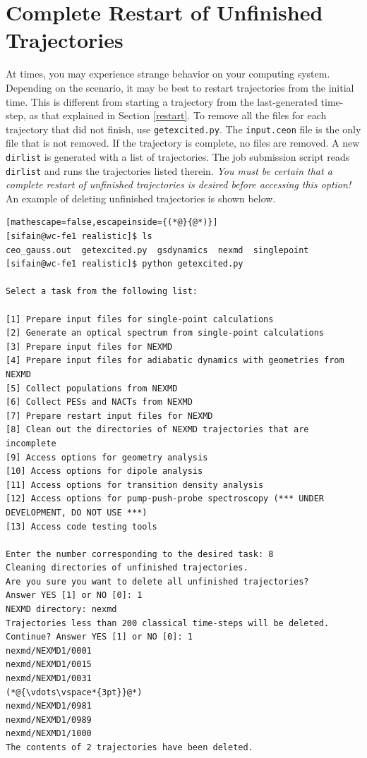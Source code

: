 \documentclass[letterpaper,12pt,titlepage]{article}
\begin{document}
\section{Complete Restart of Unfinished Trajectories}
At times, you may experience strange behavior on your computing system.  Depending on the scenario, it may be best to restart trajectories from the initial time.  This is different from starting a trajectory from the last-generated time-step, as that explained in Section \ref{restart}.  To remove all the files for each trajectory that did not finish, use \verb+getexcited.py+.  The \verb+input.ceon+ file is the only file that is not removed.  If the trajectory is complete, no files are removed.  A new \verb+dirlist+ is generated with a list of trajectories.  The job submission script reads \verb+dirlist+ and runs the trajectories listed therein.  \textit{You must be certain that a complete restart of unfinished trajectories is desired before accessing this option!}  An example of deleting unfinished trajectories is shown below.
\begin{lstlisting}[mathescape=false,escapeinside={(*@}{@*)}]
[sifain@wc-fe1 realistic]$ ls
ceo_gauss.out  getexcited.py  gsdynamics  nexmd  singlepoint
[sifain@wc-fe1 realistic]$ python getexcited.py 

Select a task from the following list:

[1] Prepare input files for single-point calculations
[2] Generate an optical spectrum from single-point calculations
[3] Prepare input files for NEXMD
[4] Prepare input files for adiabatic dynamics with geometries from NEXMD
[5] Collect populations from NEXMD
[6] Collect PESs and NACTs from NEXMD
[7] Prepare restart input files for NEXMD
[8] Clean out the directories of NEXMD trajectories that are incomplete
[9] Access options for geometry analysis
[10] Access options for dipole analysis
[11] Access options for transition density analysis
[12] Access options for pump-push-probe spectroscopy (*** UNDER DEVELOPMENT, DO NOT USE ***)
[13] Access code testing tools

Enter the number corresponding to the desired task: 8
Cleaning directories of unfinished trajectories.
Are you sure you want to delete all unfinished trajectories?
Answer YES [1] or NO [0]: 1
NEXMD directory: nexmd 
Trajectories less than 200 classical time-steps will be deleted.
Continue? Answer YES [1] or NO [0]: 1
nexmd/NEXMD1/0001
nexmd/NEXMD1/0015
nexmd/NEXMD1/0031
(*@{\vdots\vspace*{3pt}}@*)
nexmd/NEXMD1/0981
nexmd/NEXMD1/0989
nexmd/NEXMD1/1000
The contents of 2 trajectories have been deleted.
\end{lstlisting}
\end{document}
